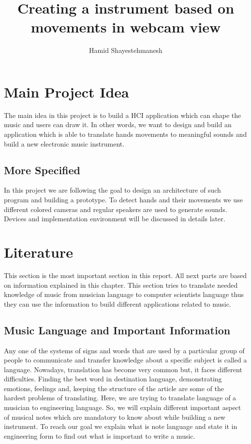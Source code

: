 \documentclass{report}
\begin{document}
\author{Hamid Shayestehmanesh}
\title{Creating a instrument based on movements in webcam view}
\maketitle
\tableofcontents
\newpage

\section{Main Project Idea}

The main idea in this project is to build a HCI application which can shape the music and users can draw it. In other words, we want to design and build an application which is able to translate hands movements to meaningful sounds and build a new electronic music instrument.
\subsection{More Specified}
In this project we are following the goal to design an architecture of such program and building a prototype. To detect hands and their movements we use different colored cameras and regular speakers are used to generate sounds. Devices and implementation environment will be discussed in details later.
\pagebreak


\section{Literature}
This section is the most important section in this report. All next parts are based on information explained in this chapter. This section tries to translate needed knowledge of music from musician language to computer scientists language thus they can use the information to build different applications related to music.
\subsection{Music Language and Important Information}
Any one of the systems of signs and words that are used by a particular group of people to communicate and transfer knowledge about a specific subject is called a language\citep{Lang}. Nowadays, translation has become very common but, it faces different difficulties. Finding the best word in destination language, demonstrating emotions, feelings and, keeping the structure of the article are some of the hardest problems of translating. Here, we are trying to translate language of a musician to engineering language. So, we will explain different important aspect of musical notes which are mandatory to know about while building a new instrument. To reach our goal we explain what is note language and state it in engineering form to find out what is important to write a music. 
\end{document}
